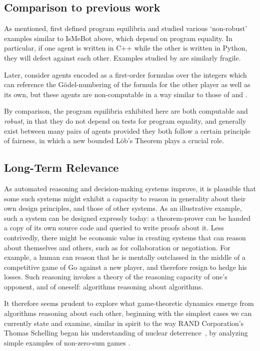 \documentclass[onecolumn,authordate]{miri-tech-article}
\numberwithin{equation}{section}
\theoremstyle{definition}
\renewcommand{\-}{^{-1}}
\begin{document}
\subsection{Comparison to previous work}

As mentioned, \citet{Tennenholtz:2004:Program} first defined program equilibria and studied various `non-robust' examples similar to IsMeBot above, which depend on program equality.  In particular, if one agent is written in C++ while the other is written in Python, they will defect against each other.  Examples studied by \citet{Fortnow:2009:Program} are similarly fragile.

Later, \citet{Peters:2012:Definable} consider agents encoded as a first-order formulas over the integers which can reference the G\"{o}del-numbering of the formula for the other player as well as its own, but these agents are non-computable in a way similar to those of \citet{Barasz:2014:RobustCooperation} and \citet{LaVictoire:2014:PrisDilemmaLob}.

By comparison, the program equilibria exhibited here are both computable and {\em robust}, in that they do not depend on tests for program equality, and generally exist between many pairs of agents provided they both follow a certain principle of fairness, in which a new bounded L\"{o}b's Theorem plays a crucial role.

\subsection{Long-Term Relevance}

As automated reasoning and decision-making systems improve, it is plausible that some such systems might exhibit a capacity to reason in generality about their own design principles, and those of other systems.  As an illustrative example, such a system can be designed expressly today: a theorem-prover can be handed a copy of its own source code and queried to write proofs about it.  Less contrivedly, there might be economic value in creating systems that can reason about themselves and others, such as for collaboration or negotiation.  For example, a human can reason that he is mentally outclassed in the middle of a competitive game of Go against a new player, and therefore resign to hedge his losses.  Such reasoning invokes a theory of the reasoning capacity of one's opponent, and of oneself: algorithms reasoning about algorithms.

It therefore seems prudent to explore what game-theoretic dynamics emerge from algorithms reasoning about each other, beginning with the simplest cases we can currently state and examine, similar in spirit to the way RAND Corporation's Thomas Schelling began his understanding of nuclear deterrence~\citep{Schelling:1958:ConflictProspectus,Schelling:1966:Arms}, by analyzing simple examples of non-zero-sum games \citep{Schelling:1958:Reinterpretation}.
\end{document}

